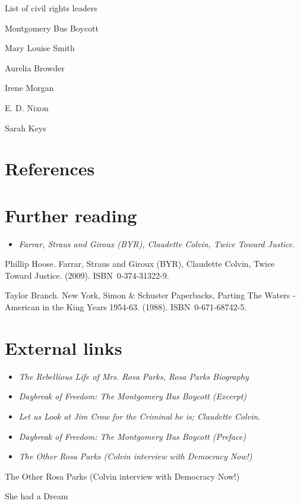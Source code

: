 List of civil rights leaders

Montgomery Bus Boycott

Mary Louise Smith

Aurelia Browder

Irene Morgan

E. D. Nixon

Sarah Keys

\section{References}\label{references}

\section{Further reading}\label{further-reading}

\begin{itemize}
\item
  \emph{Farrar, Straus and Giroux (BYR), Claudette Colvin, Twice Toward
  Justice.}
\end{itemize}

Phillip Hoose. Farrar, Straus and Giroux (BYR), Claudette Colvin, Twice
Toward Justice. (2009). ISBN~0-374-31322-9.

Taylor Branch. New York, Simon \& Schuster Paperbacks, Parting The
Waters - American in the King Years 1954-63. (1988). ISBN~0-671-68742-5.

\section{External links}\label{external-links}

\begin{itemize}
\item
  \emph{The Rebellious Life of Mrs. Rosa Parks, Rosa Parks Biography}
\item
  \emph{Daybreak of Freedom: The Montgomery Bus Boycott (Excerpt)}
\item
  \emph{Let us Look at Jim Crow for the Criminal he is; Claudette
  Colvin.}
\item
  \emph{Daybreak of Freedom: The Montgomery Bus Boycott (Preface)}
\item
  \emph{The Other Rosa Parks (Colvin interview with Democracy Now!)}
\end{itemize}

The Other Rosa Parks (Colvin interview with Democracy Now!)

She had a Dream


